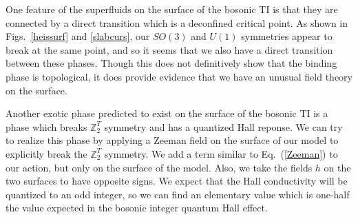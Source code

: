 \documentclass[prb,twocolumn]{revtex4-1}
\def\ztwot{\mathbb{Z}_2^T}
\begin{document}
One feature of the superfluids on the surface of the bosonic TI is that they are connected by a direct transition which is a deconfined critical point.\cite{SenthilVishwanath} As shown in Figs.~\ref{heissurf} and \ref{slabcurs}, our $SO(3)$ and $U(1)$ symmetries appear to break at the same point, and so it seems that we also have a direct transition between these phases.
Though this does not definitively show that the binding phase is topological, it does provide evidence that we have an unusual field theory on the surface.


Another exotic phase predicted to exist on the surface of the bosonic TI is a phase which breaks $\ztwot$ symmetry and has a quantized Hall reponse. We can try to realize this phase by applying a Zeeman field on the surface of our model to explicitly break the $\ztwot$ symmetry. We add a term similar to Eq.~(\ref{Zeeman}) to our action, but only on the surface of the model. Also, we take the fields $h$ on the two surfaces to have opposite signs. We expect that the Hall conductivity will be quantized to an odd integer, so we can find an elementary value which is one-half the value expected in the bosonic integer quantum Hall effect.
\end{document}
